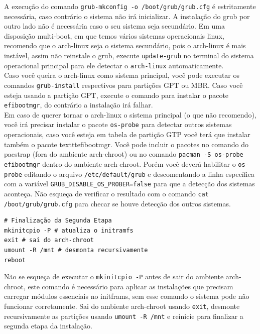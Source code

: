 \documentclass[12pt,a4paper]{article}
\begin{document}
\vspace{\baselineskip}

A execução do comando \texttt{grub-mkconfig -o /boot/grub/grub.cfg} é estritamente necessária, caso contrário o sistema não irá inicializar. A instalação do grub por outro lado não é necessária caso o seu sistema seja secundário. Em uma disposição multi-boot, em que temos vários sistemas operacionais linux, recomendo que o arch-linux seja o sistema secundário, pois o arch-linux é mais instável, assim não reinstale o grub, execute \texttt{update-grub} no terminal do sistema operacional principal para ele detectar o \texttt{arch-linux} automaticamente. \\

Caso você queira o arch-linux como sistema principal, você pode executar os comandos \texttt{grub-install} respectivos para partições GPT ou MBR. Caso você esteja usando a partição GPT, execute o comando para instalar o pacote \texttt{efibootmgr}, do contrário a instalação irá falhar. \\

Em caso de querer tornar o arch-linux o sistema principal (o que não recomendo), você irá precisar instalar o pacote \texttt{os-probe} para detectar outros sistemas operacionais, caso você esteja em tabela de partição GTP você terá que instalar também o pacote texttt{efibootmgr}. Você pode incluir o pacotes no comando do pacstrap (fora do ambiente arch-chroot) ou no comando \texttt{pacman -S os-probe efibootmgr} dentro do ambiente arch-chroot. Porém você deverá habilitar o \texttt{os-probe} editando o arquivo \texttt{/etc/default/grub} e descomentando a linha específica com a variável \texttt{GRUB\_DISABLE\_OS\_PROBER=false} para que a detecção dos sistemas aconteça. Não esqueça de verificar o resultado com o comando \texttt{cat /boot/grub/grub.cfg} para checar se houve detecção dos outros sistemas. \\

\begin{lstlisting}
# Finalização da Segunda Etapa
mkinitcpio -P # atualiza o initramfs 
exit # sai do arch-chroot 
umount -R /mnt # desmonta recursivamente
reboot 
\end{lstlisting}

\vspace{\baselineskip}

Não se esqueça de executar o \texttt{mkinitcpio -P} antes de sair do ambiente arch-chroot, este comando é necessário para aplicar as instalações que precisam carregar módulos essenciais no initframs, sem esse comando o sistema pode não funcionar corretamente. Sai do ambiente arch-chroot usando \texttt{exit}, desmonte recursivamente as partições usando \texttt{umount -R /mnt} e reinicie para finalizar a segunda etapa da instalação.\\
\end{document}
